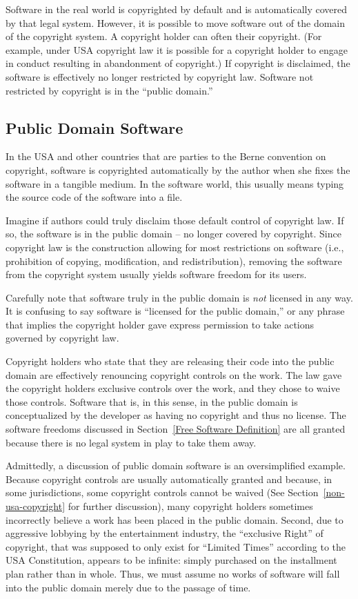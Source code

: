 Software in the real world is copyrighted by default and is automatically
covered by that legal system.  However, it is possible to move software out
of the domain of the copyright system.  A copyright holder can often
 their copyright. (For example, under USA copyright law
it is possible for a copyright holder to engage in conduct resulting
in abandonment of copyright.)  If copyright is disclaimed, the software is
effectively no longer restricted by copyright law.   Software not restricted by copyright is in the
``public domain.''

\subsection{Public Domain Software}

In the USA and other countries that
are parties to the Berne convention on copyright, software is copyrighted
automatically by the author when she fixes the software in a tangible
medium.  In the software world, this usually means typing the source code
of the software into a file.

Imagine if authors could truly disclaim those default control of copyright
law.  If so, the software is in the public domain -- no longer covered by
copyright.  Since copyright law is the construction allowing for most
restrictions on software (i.e., prohibition of copying, modification, and
redistribution), removing the software from the copyright system usually
yields software freedom for its users.

Carefully note that software truly in the public domain is \emph{not} licensed
in any way. It is confusing to say software is ``licensed for the
public domain,'' or any phrase that implies the copyright holder gave
express permission to take actions governed by copyright law.

Copyright holders who state that they are releasing their code into
the public domain are effectively renouncing copyright controls on
the work.  The law gave the copyright holders exclusive controls over the
work, and they chose to waive those controls.  Software that is, in
this sense, in the public domain
is conceptualized by the developer as having no copyright and thus no license. The software freedoms discussed in
Section~\ref{Free Software Definition} are all granted because there is no
legal system in play to take them away.

Admittedly, a discussion of public domain software is an oversimplified
example.  
Because copyright controls are usually automatically granted and because, in
some jurisdictions, some copyright controls cannot be waived (See
Section~\ref{non-usa-copyright} for further discussion), many copyright
holders sometimes incorrectly believe a work has been placed in the public
domain.  Second, due to aggressive lobbying by the entertainment industry,
the ``exclusive Right'' of copyright, that was supposed to only exist for
``Limited Times'' according to the USA Constitution, appears to be infinite:
simply purchased on the installment plan rather than in whole.  Thus, we must
assume no works of software will fall into the public domain merely due to
the passage of time.


